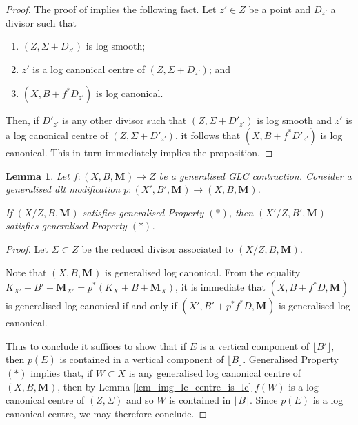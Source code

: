 \documentclass[12pt]{amsart}
\theoremstyle{plain}
\newtheorem{lemma}[theorem]{Lemma}
\theoremstyle{definition}
\def\bM#1.{\mathbf{M}_{#1}}
\begin{document}
\begin{proof}
%
The proof of \cite[Proposition 2.19]{ACSS} implies the following fact.
Let $z' \in Z$ be a point and $D_{z'}$ a
divisor such that 
\begin{enumerate}
\item $(Z, \Sigma+D_{z'})$ is log smooth;
\item $z'$ is a log canonical centre of $(Z, \Sigma+D_{z'})$; and
\item  $(X, B+f^*D_{z'})$ is log canonical.
\end{enumerate}
Then, if $D'_{z'}$ is any other divisor such 
that $(Z, \Sigma+D'_{z'})$ is log smooth and $z'$ 
is a log canonical centre of $(Z, \Sigma+D'_{z'})$, it follows 
that $(X, B+f^*D'_{z'})$ is log canonical.
This in turn immediately implies the proposition.
\end{proof}


\begin{lemma}
\label{lem_dlt_mod_*}
Let $f\colon (X, B,\bM.) \rightarrow Z$ be a generalised GLC contraction.
Consider a generalised dlt modification $p\colon (X', B',\bM.) \rightarrow (X, B,\bM.)$.

If $(X/Z, B,\bM.)$ satisfies generalised Property $(*)$, then $(X'/Z, B',\bM.)$ 
satisfies generalised Property $(*)$.
\end{lemma}
\begin{proof}
Let $\Sigma \subset Z$ be the reduced divisor associated to $(X/Z, B,\bM.)$.

Note that $(X, B,\bM.)$ is generalised log canonical.
From the equality $K_{X'}+B'+\bM X'.= p^*(K_X+B+\bM X.)$, it is immediate that $(X, B+f^*D,\bM.)$ is generalised log canonical if and only if $(X', B'+p^*f^*D,\bM.)$ is generalised log canonical.

Thus to conclude it suffices to show that if $E$ is a vertical component of $\lfloor B' \rfloor$, then 
$p(E)$ is contained in a vertical component of $\lfloor B\rfloor$.
Generalised Property $(*)$ implies that, if $W \subset X$ is any generalised log canonical centre of $(X,B,\bM.)$, 
then by Lemma \ref{lem_img_lc_centre_is_lc} $f(W)$ is a log canonical centre of $(Z, \Sigma)$ and 
so $W$ is contained in $\lfloor B \rfloor$.
Since $p(E)$ is a log canonical centre, we may therefore conclude.
\end{proof}
\end{document}
